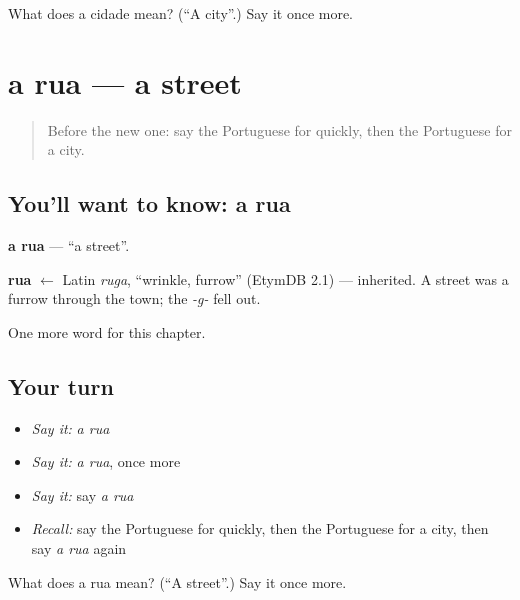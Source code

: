 \begin{tcolorbox}[breakable,colback=teal!4,colframe=teal!35!black,title={Before you move on}]
What does a cidade mean? (\textquotedblleft{}A city\textquotedblright{}.) Say it once more.
\end{tcolorbox}
\section[a rua]{a rua — a street}

\label{lesson:PT-C73-rua}



\begin{quote}
Before the new one: say the Portuguese for quickly, then the Portuguese for a city.
\end{quote}

\subsection*{You'll want to know: a rua}
\textbf{a rua} — \textquotedblleft{}a street\textquotedblright{}.

\begin{cousinweb}
\textbf{rua} $\leftarrow$ Latin \emph{ruga}, \textquotedblleft{}wrinkle, furrow\textquotedblright{} (EtymDB 2.1) — inherited. A street was a furrow through the town; the \emph{-g-} fell out.
\end{cousinweb}

\begin{grammarlens}[title={What you've built}]
One more word for this chapter.
\end{grammarlens}

\subsection*{Your turn}
\begin{itemize}
\raggedright
  \item \emph{Say it:} \emph{a rua}
  \item \emph{Say it:} \emph{a rua}, once more
  \item \emph{Say it:} say \emph{a rua}
  \item \emph{Recall:} say the Portuguese for quickly, then the Portuguese for a city, then say \emph{a rua} again
\end{itemize}

\begin{tcolorbox}[breakable,colback=teal!4,colframe=teal!35!black,title={Before you move on}]
What does a rua mean? (\textquotedblleft{}A street\textquotedblright{}.) Say it once more.
\end{tcolorbox}

